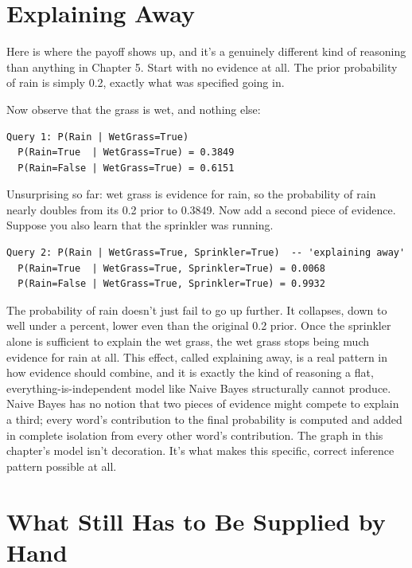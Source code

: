 \section*{Explaining Away}

Here is where the payoff shows up, and it's a genuinely different kind of reasoning than anything in Chapter 5. Start with no evidence at all. The prior probability of rain is simply 0.2, exactly what was specified going in.

Now observe that the grass is wet, and nothing else:

\begin{Verbatim}[fontsize=\small, frame=single, xleftmargin=1em, xrightmargin=1em]
Query 1: P(Rain | WetGrass=True)
  P(Rain=True  | WetGrass=True) = 0.3849
  P(Rain=False | WetGrass=True) = 0.6151
\end{Verbatim}

Unsurprising so far: wet grass is evidence for rain, so the probability of rain nearly doubles from its 0.2 prior to 0.3849. Now add a second piece of evidence. Suppose you also learn that the sprinkler was running.

\begin{Verbatim}[fontsize=\small, frame=single, xleftmargin=1em, xrightmargin=1em]
Query 2: P(Rain | WetGrass=True, Sprinkler=True)  -- 'explaining away'
  P(Rain=True  | WetGrass=True, Sprinkler=True) = 0.0068
  P(Rain=False | WetGrass=True, Sprinkler=True) = 0.9932
\end{Verbatim}

The probability of rain doesn't just fail to go up further. It collapses, down to well under a percent, lower even than the original 0.2 prior. Once the sprinkler alone is sufficient to explain the wet grass, the wet grass stops being much evidence for rain at all. This effect, called explaining away, is a real pattern in how evidence should combine, and it is exactly the kind of reasoning a flat, everything-is-independent model like Naive Bayes structurally cannot produce. Naive Bayes has no notion that two pieces of evidence might compete to explain a third; every word's contribution to the final probability is computed and added in complete isolation from every other word's contribution. The graph in this chapter's model isn't decoration. It's what makes this specific, correct inference pattern possible at all.

\section*{What Still Has to Be Supplied by Hand}

